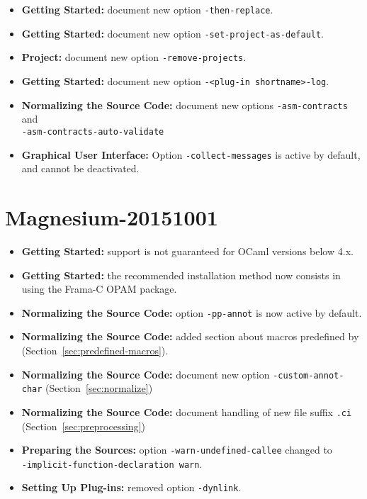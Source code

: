 \begin{itemize}
\item \textbf{Getting Started:} document new option \texttt{-then-replace}.
\item \textbf{Getting Started:} document new option
\texttt{-set-project-as-default}.
\item \textbf{Project:} document new option \texttt{-remove-projects}.
\item \textbf{Getting Started:} document new option
  \texttt{-<plug-in shortname>-log}.
\item \textbf{Normalizing the Source Code:} document new options
  \texttt{-asm-contracts} and\\ \texttt{-asm-contracts-auto-validate}
\item \textbf{Graphical User Interface:} Option \texttt{-collect-messages} is
  active by default, and cannot be deactivated.
\end{itemize}

\section*{Magnesium-20151001}
\begin{itemize}
\item \textbf{Getting Started:} support is not guaranteed for OCaml versions
below 4.x.
\item \textbf{Getting Started:} the recommended installation method now consists
in using the Frama-C OPAM package.
\item \textbf{Normalizing the Source Code:} option \texttt{-pp-annot} is now
active by default.
\item \textbf{Normalizing the Source Code:} added section about macros
predefined by \FramaC (Section~\ref{sec:predefined-macros}).
\item \textbf{Normalizing the Source Code:} document new option 
  \texttt{-custom-annot-char} (Section~\ref{sec:normalize})
\item \textbf{Normalizing the Source Code:} document handling of 
  new file suffix \texttt{.ci} (Section~\ref{sec:preprocessing})
\item \textbf{Preparing the Sources:} option \texttt{-warn-undefined-callee}
  changed to \\ \texttt{-implicit-function-declaration warn}.
\item \textbf{Setting Up Plug-ins:} removed option \texttt{-dynlink}.
\end{itemize}

